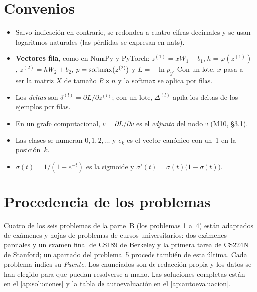 \section*{Convenios}
\begin{itemize}[leftmargin=1.4em]
  \item Salvo indicación en contrario, se redondea a cuatro cifras decimales y se usan logaritmos naturales (las pérdidas se expresan en nats).
  \item \textbf{Vectores fila}, como en NumPy y PyTorch: $z^{(1)}=xW_1+b_1$, $h=\varphi(z^{(1)})$, $z^{(2)}=hW_2+b_2$, $p=\operatorname{softmax}(z^{(2)})$ y $L=-\ln p_y$. Con un lote, $x$ pasa a ser la matriz $X$ de tamaño $B\times n$ y la softmax se aplica por filas.
  \item Los \emph{deltas} son $\delta^{(l)}=\partial L/\partial z^{(l)}$; con un lote, $\Delta^{(l)}$ apila los deltas de los ejemplos por filas.
  \item En un grafo computacional, $\bar v=\partial L/\partial v$ es el \emph{adjunto} del nodo $v$ (M10, §3.1).
  \item Las clases se numeran $0,1,2,\dots$ y $e_k$ es el vector canónico con un~1 en la posición~$k$.
  \item $\sigma(t)=1/(1+e^{-t})$ es la sigmoide y $\sigma'(t)=\sigma(t)\bigl(1-\sigma(t)\bigr)$.
\end{itemize}

\section*{Procedencia de los problemas}
Cuatro de los seis problemas de la parte~B (los problemas 1 a~4) están adaptados de exámenes y hojas de problemas de cursos universitarios: dos exámenes parciales y un examen final de CS189 de Berkeley y la primera tarea de CS224N de Stanford; un apartado del problema~5 procede también de esta última. Cada problema indica su \emph{Fuente}. Los enunciados son de redacción propia y los datos se han elegido para que puedan resolverse a mano. Las soluciones completas están en el \cref{ap:soluciones} y la tabla de autoevaluación en el \cref{ap:autoevaluacion}.
